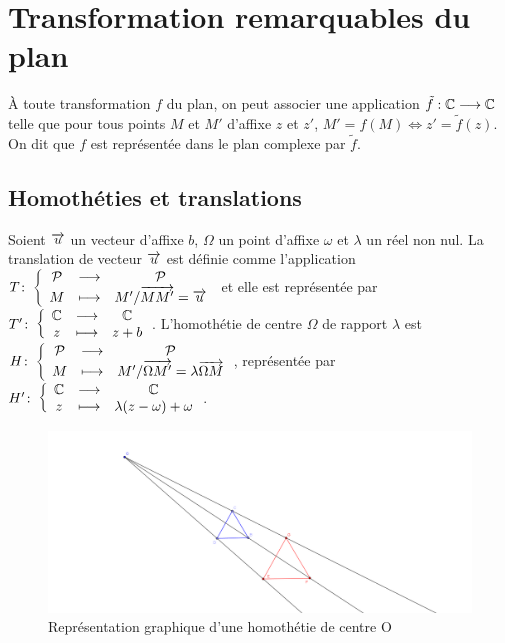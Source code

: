 \section{Transformation remarquables du plan}

À toute transformation $f$ du plan, on peut associer une application $\tilde{f} : \mathbb{C} \longrightarrow \mathbb{C}$ telle que pour tous points $M$ et $M'$ d'affixe $z$ et $z'$, $M'=f(M) \iff z'=\tilde{f}(z)$. On dit que $f$ est représentée dans le plan complexe par $\tilde{f}$.

\subsection{Homothéties et translations}
\begin{defdef}
  Soient $\overrightarrow{u}$ un vecteur d'affixe $b$, $\Omega$ un point d'affixe $\omega$ et $\lambda$ un réel non nul. La translation de vecteur $\overrightarrow{u}$ est définie comme l'application $T\colon \left\{\begin{array}{ccc} \mathcal{P} & \longrightarrow &\mathcal{P}\\ M & \longmapsto & M' / \overrightarrow{MM'}=\overrightarrow{u} \end{array} \right.$ et elle est représentée par $T'\colon \left\{\begin{array}{ccc} \mathbb{C} & \longrightarrow &\mathbb{C}\\ z & \longmapsto & z+b \end{array} \right.$. L'homothétie de centre $\Omega$ de rapport $\lambda$ est $H\colon \left\{\begin{array}{ccc} \mathcal{P} & \longrightarrow &\mathcal{P}\\ M & \longmapsto & M' / \overrightarrow{\Omega M'}=\lambda \overrightarrow{\Omega M} \end{array} \right.$, représentée par $H'\colon \left\{\begin{array}{ccc} \mathbb{C} & \longrightarrow &\mathbb{C}\\ z & \longmapsto & \lambda(z-\omega)+\omega \end{array} \right.$.
\end{defdef}
 \begin{figure}
   \centering
   \includegraphics[width=\textwidth]{homothetie.png}
   \caption{Représentation graphique d'une homothétie de centre O}
   \label{fig:homothetie}
 \end{figure}

